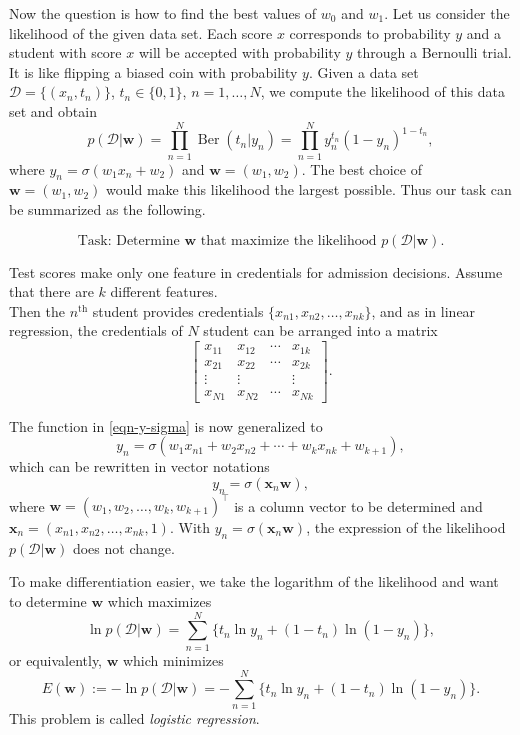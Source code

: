 \documentclass[
]{article}
\begin{document}
Now the question is how to find the best values of \(w_0\) and \(w_1\).
Let us consider the likelihood of the given data set. Each score \(x\)
corresponds to probability \(y\) and a student with score \(x\) will be
accepted with probability \(y\) through a Bernoulli trial. It is like
flipping a biased coin with probability \(y\). Given a data set
\(\mathcal D=\{(x_n, t_n) \}\), \(t_n \in \{ 0,1 \}\),
\(n=1, \dots, N\), we compute the likelihood of this data set and obtain
\[ p(\mathcal D|{\boldsymbol{w}}) =  \prod_{n=1}^N \operatorname{Ber}(t_n|y_n) = \prod_{n=1}^N y_n^{t_n} (1-y_n)^{1-t_n}, \]
where \(y_n= \sigma(w_1 x_n+w_2)\) and \({\boldsymbol{w}}=(w_1, w_2)\).
The best choice of \({\boldsymbol{w}}=(w_1,w_2)\) would make this
likelihood the largest possible. Thus our task can be summarized as the
following.

\[\text{Task: Determine ${\boldsymbol{w}}$ that maximize the likelihood $p(\mathcal D|{\boldsymbol{w}})$.}\]

Test scores make only one feature in credentials for admission
decisions. Assume that there are \(k\) different features.\\
Then the \(n^\mathrm{th}\) student provides credentials
\(\{x_{n1}, x_{n2}, \dots , x_{nk} \}\), and as in linear regression,
the credentials of \(N\) student can be arranged into a matrix
\[  \begin{bmatrix} x_{11} & x_{12} & \cdots & x_{1k} \\ x_{21} & x_{22} & \cdots & x_{2k} \\ \vdots & \vdots & & \vdots \\ x_{N1} & x_{N2} & \cdots & x_{Nk} \end{bmatrix} .\]

The function in \eqref{eqn-y-sigma} is now generalized to
\[ y_n=\sigma(w_1 x_{n1}+ w_2 x_{n2} + \cdots + w_k x_{nk}+w_{k+1} ), \]
which can be rewritten in vector notations
\[ y_n= \sigma( {\boldsymbol{x}}_n{\boldsymbol{w}}) ,\] where
\({\boldsymbol{w}}=(w_1, w_2, \dots , w_k, w_{k+1})^\top\) is a column
vector to be determined and
\({\boldsymbol{x}}_n=(x_{n1}, x_{n2}, \dots, x_{nk}, 1)\). With
\(y_n=\sigma({\boldsymbol{x}}_n {\boldsymbol{w}})\), the expression of
the likelihood \(p(\mathcal D| {\boldsymbol{w}})\) does not change.

To make differentiation easier, we take the logarithm of the likelihood
and want to determine \({\boldsymbol{w}}\) which maximizes
\[ \ln p(\mathcal D|{\boldsymbol{w}}) = \sum_{n=1}^N \{ t_n \ln y_n + (1-t_n) \ln (1-y_n)\} ,\]
or equivalently, \({\boldsymbol{w}}\) which minimizes
\[ E({\boldsymbol{w}}):=-\ln p(\mathcal D|{\boldsymbol{w}}) = -\sum_{n=1}^N \{ t_n \ln y_n + (1-t_n) \ln (1-y_n)\} .\]
This problem is called \emph{logistic regression}.
\end{document}
